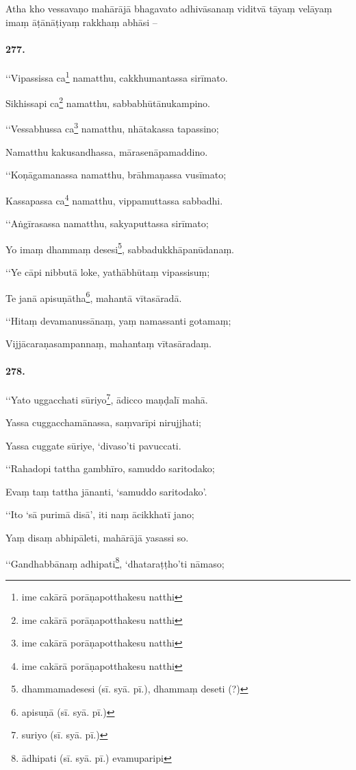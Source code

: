 Atha kho vessavaṇo mahārājā bhagavato adhivāsanaṃ viditvā tāyaṃ velāyaṃ imaṃ āṭānāṭiyaṃ rakkhaṃ abhāsi –

\paragraph{277.} ‘‘Vipassissa ca\footnote{ime cakārā porāṇapotthakesu natthi} namatthu, cakkhumantassa sirīmato.

Sikhissapi ca\footnote{ime cakārā porāṇapotthakesu natthi} namatthu, sabbabhūtānukampino.

‘‘Vessabhussa ca\footnote{ime cakārā porāṇapotthakesu natthi} namatthu, nhātakassa tapassino;

Namatthu kakusandhassa, mārasenāpamaddino.

‘‘Koṇāgamanassa namatthu, brāhmaṇassa vusīmato;

Kassapassa ca\footnote{ime cakārā porāṇapotthakesu natthi} namatthu, vippamuttassa sabbadhi.

‘‘Aṅgīrasassa namatthu, sakyaputtassa sirīmato;

Yo imaṃ dhammaṃ desesi\footnote{dhammamadesesi (sī. syā. pī.), dhammaṃ deseti (?)}, sabbadukkhāpanūdanaṃ.

‘‘Ye cāpi nibbutā loke, yathābhūtaṃ vipassisuṃ;

Te janā apisuṇātha\footnote{apisuṇā (sī. syā. pī.)}, mahantā vītasāradā.

‘‘Hitaṃ devamanussānaṃ, yaṃ namassanti gotamaṃ;

Vijjācaraṇasampannaṃ, mahantaṃ vītasāradaṃ.

\paragraph{278.} ‘‘Yato uggacchati sūriyo\footnote{suriyo (sī. syā. pī.)}, ādicco maṇḍalī mahā.

Yassa cuggacchamānassa, saṃvarīpi nirujjhati;

Yassa cuggate sūriye, ‘divaso’ti pavuccati.

‘‘Rahadopi tattha gambhīro, samuddo saritodako;

Evaṃ taṃ tattha jānanti, ‘samuddo saritodako’.

‘‘Ito ‘sā purimā disā’, iti naṃ ācikkhatī jano;

Yaṃ disaṃ abhipāleti, mahārājā yasassi so.

‘‘Gandhabbānaṃ adhipati\footnote{ādhipati (sī. syā. pī.) evamuparipi}, ‘dhataraṭṭho’ti nāmaso;

